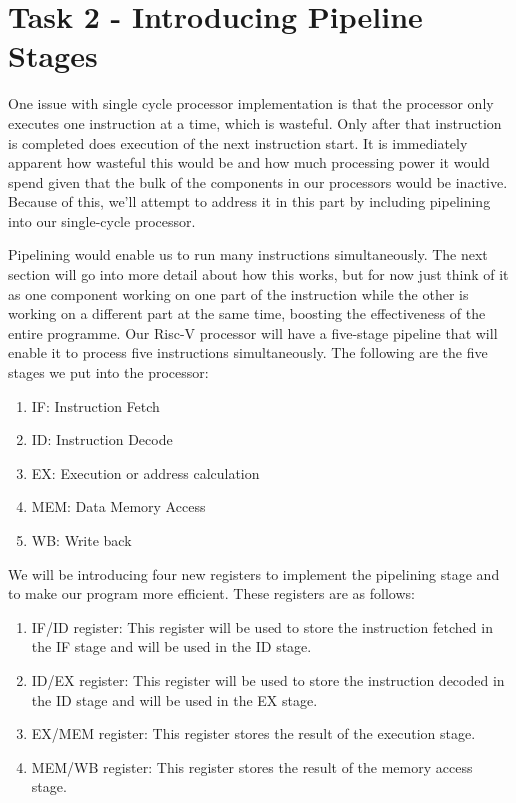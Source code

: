 \documentclass{article}
\begin{document}
\section{Task 2 - Introducing Pipeline Stages}

One issue with single cycle processor implementation is that the processor only executes one instruction at a time, which is wasteful. Only after that instruction is completed does execution of the next instruction start. It is immediately apparent how wasteful this would be and how much processing power it would spend given that the bulk of the components in our processors would be inactive. Because of this, we'll attempt to address it in this part by including pipelining into our single-cycle processor.

Pipelining would enable us to run many instructions simultaneously. The next section will go into more detail about how this works, but for now just think of it as one component working on one part of the instruction while the other is working on a different part at the same time, boosting the effectiveness of the entire programme. Our Risc-V processor will have a five-stage pipeline that will enable it to process five instructions simultaneously. The following are the five stages we put into the processor:

\begin{enumerate}
    \item IF: Instruction Fetch
    \item ID: Instruction Decode 
    \item EX: Execution or address calculation
    \item MEM: Data Memory Access
    \item WB: Write back

\end{enumerate}

We will be introducing four new registers to implement the pipelining stage and to make our program more efficient. These registers are as follows:

\begin{enumerate}
    \item IF/ID register: This register will be used to store the instruction fetched in the IF stage and will be used in the ID stage.
    \item ID/EX register: This register will be used to store the instruction decoded in the ID stage and will be used in the EX stage.
    \item EX/MEM register: This register stores the result of the execution stage.
    \item MEM/WB register: This register stores the result of the memory access stage.
\end{enumerate}
\end{document}
